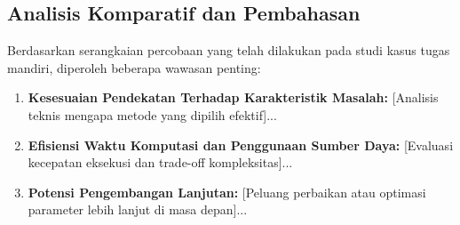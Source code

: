 \subsection{Analisis Komparatif dan Pembahasan}
Berdasarkan serangkaian percobaan yang telah dilakukan pada studi kasus tugas mandiri, diperoleh beberapa wawasan penting:
\begin{enumerate}
    \item \textbf{Kesesuaian Pendekatan Terhadap Karakteristik Masalah:} [Analisis teknis mengapa metode yang dipilih efektif]...
    \item \textbf{Efisiensi Waktu Komputasi dan Penggunaan Sumber Daya:} [Evaluasi kecepatan eksekusi dan trade-off kompleksitas]...
    \item \textbf{Potensi Pengembangan Lanjutan:} [Peluang perbaikan atau optimasi parameter lebih lanjut di masa depan]...
\end{enumerate}
